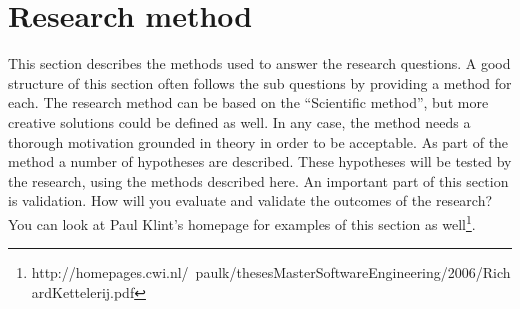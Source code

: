 \chapter{Research method}
\label{method}

This section describes the methods used to answer the research questions. A
good structure of this section often follows the sub questions by providing a
method for each.
The research method can be based on the “Scientific method”, but more creative
solutions could be defined as well. In any case, the method needs a thorough
motivation grounded in theory in order to be acceptable.
As part of the method a number of hypotheses are described. These hypotheses
will be tested by the research, using the methods described here.
An important part of this section is validation. How will you evaluate and
validate the outcomes of the research? You can look at Paul Klint’s homepage
for examples of this section as
well\footnote{http://homepages.cwi.nl/~paulk/thesesMasterSoftwareEngineering/2006/RichardKettelerij.pdf}.

